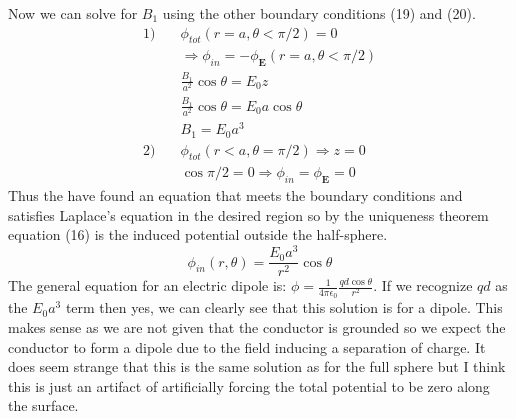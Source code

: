 \documentclass[a4paper, 11pt]{article}
\begin{document}
Now we can solve for $B_1$ using the other boundary conditions (19) and (20).
\begin{align*}
	1) \quad &\phi_{tot}(r=a, \theta < \pi/2) = 0\\ 
	&\Rightarrow \phi_{in} = -\phi_{\mathbf{E}}(r=a, \theta < \pi/2)\\
	&\frac{B_1}{a^2}\cos{\theta} = E_0z \\ 
	&\frac{B_1}{a^2}\cos{\theta} = E_0a\cos{\theta}\\ 
	&B_1 = E_0a^3 \\ 
	2) \quad &\phi_{tot}(r < a, \theta = \pi/2) \Rightarrow z = 0\\ 
	& \cos{\pi/2} = 0 \Rightarrow \phi_{in} = \phi_{\mathbf{E}} = 0
\end{align*}
Thus the have found an equation that meets the boundary conditions and satisfies Laplace's equation in the desired region so by the uniqueness theorem equation (16) is the induced potential outside the half-sphere. 
\begin{equation}
	\phi_{in}(r,\theta) = \frac{E_0a^3}{r^2}\cos{\theta}
\end{equation}
The general equation for an electric dipole is: $\phi = \frac{1}{4\pi\epsilon_0}\frac{qd\cos{\theta}}{r^2}$. If we recognize $qd$ as the $E_0a^3$ term then yes, we can clearly see that this solution is for a dipole. This makes sense as we are not given that the conductor is grounded so we expect the conductor to form a dipole due to the field inducing a separation of charge. It does seem strange that this is the same solution as for the full sphere but I think this is just an artifact of artificially forcing the total potential to be zero along the surface. 
\end{document}

